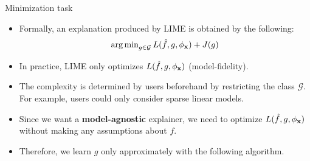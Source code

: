 \documentclass[11pt,compress,t,notes=noshow, xcolor=table]{beamer}
\newcommand{\Gspace}{\mathcal{G}}
\newcommand{\neigh}{\phi_{\xv}}
\begin{document}
\begin{vbframe}{Minimization task}
	\begin{itemize}
		\item Formally, an explanation produced by LIME is obtained by the following: 
		$$ \argmin_{g \in \Gspace} L(\fh, g, \neigh) + J(g)$$
		\item In practice, LIME only optimizes $L(\fh, g, \neigh)$ (model-fidelity). 	
		\item The complexity is determined by users beforehand by restricting the class $\Gspace$. For example, users could only consider sparse linear models. 
		\item Since we want a \textbf{model-agnostic} explainer, we need to optimize $L(\fh, g, \neigh)$ without making any assumptions about $f$. 
		\item Therefore, we learn $g$ only approximately with the following algorithm.  
		\end{itemize}
\end{vbframe} 
\end{document}
